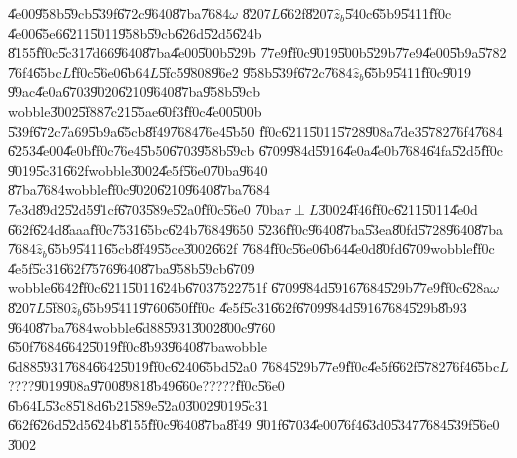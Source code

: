 \U{4e00}\U{958b}\U{59cb}\U{539f}\U{672c}\U{9640}\U{87ba}\U{7684}$\omega $%
\U{8207}$L$\U{662f}\U{8207}$\hat{z}_{b}$\U{540c}\U{65b9}\U{5411}\U{ff0c}%
\U{4e00}\U{65e6}\U{6211}\U{5011}\U{958b}\U{59cb}\U{626d}\U{52d5}\U{624b}%
\U{8155}\U{ff0c}\U{5c31}\U{7d66}\U{9640}\U{87ba}\U{4e00}\U{500b}\U{529b}%
\U{77e9}\U{ff0c}\U{9019}\U{500b}\U{529b}\U{77e9}\U{4e00}\U{5b9a}\U{5782}%
\U{76f4}\U{65bc}$L$\U{ff0c}\U{56e0}\U{6b64}$L$\U{5fc5}\U{9808}\U{96e2}%
\U{958b}\U{539f}\U{672c}\U{7684}$\hat{z}_{b}$\U{65b9}\U{5411}\U{ff0c}\U{9019}%
\U{99ac}\U{4e0a}\U{6703}\U{9020}\U{6210}\U{9640}\U{87ba}\U{958b}\U{59cb}%
wobble\U{3002}\U{5f88}\U{7c21}\U{55ae}\U{60f3}\U{ff0c}\U{4e00}\U{500b}%
\U{539f}\U{672c}\U{7a69}\U{5b9a}\U{65cb}\U{8f49}\U{7684}\U{76e4}\U{5b50}%
\U{ff0c}\U{6211}\U{5011}\U{5728}\U{908a}\U{7de3}\U{5782}\U{76f4}\U{7684}%
\U{6253}\U{4e00}\U{4e0b}\U{ff0c}\U{76e4}\U{5b50}\U{6703}\U{958b}\U{59cb}%
\U{6709}\U{984d}\U{5916}\U{4e0a}\U{4e0b}\U{7684}\U{64fa}\U{52d5}\U{ff0c}%
\U{9019}\U{5c31}\U{662f}wobble\U{3002}\U{4e5f}\U{56e0}\U{70ba}\U{9640}%
\U{87ba}\U{7684}wobble\U{ff0c}\U{9020}\U{6210}\U{9640}\U{87ba}\U{7684}%
\U{7e3d}\U{89d2}\U{52d5}\U{91cf}\U{6703}\U{589e}\U{52a0}\U{ff0c}\U{56e0}%
\U{70ba}$\tau \perp L$\U{3002}\U{4f46}\U{ff0c}\U{6211}\U{5011}\U{4e0d}%
\U{662f}\U{624d}\U{8aaa}\U{ff0c}\U{7531}\U{65bc}\U{624b}\U{7684}\U{9650}%
\U{5236}\U{ff0c}\U{9640}\U{87ba}\U{53ea}\U{80fd}\U{5728}\U{9640}\U{87ba}%
\U{7684}$\hat{z}_{b}$\U{65b9}\U{5411}\U{65cb}\U{8f49}\U{55ce}\U{3002}\U{662f}%
\U{7684}\U{ff0c}\U{56e0}\U{6b64}\U{4e0d}\U{80fd}\U{6709}wobble\U{ff0c}%
\U{4e5f}\U{5c31}\U{662f}\U{7576}\U{9640}\U{87ba}\U{958b}\U{59cb}\U{6709}%
wobble\U{6642}\U{ff0c}\U{6211}\U{5011}\U{624b}\U{6703}\U{7522}\U{751f}%
\U{6709}\U{984d}\U{5916}\U{7684}\U{529b}\U{77e9}\U{ff0c}\U{628a}$\omega $%
\U{8207}$L$\U{5f80}$\hat{z}_{b}$\U{65b9}\U{5411}\U{9760}\U{650f}\U{ff0c}%
\U{4e5f}\U{5c31}\U{662f}\U{6709}\U{984d}\U{5916}\U{7684}\U{529b}\U{8b93}%
\U{9640}\U{87ba}\U{7684}wobble\U{6d88}\U{5931}\U{3002}\U{800c}\U{9760}%
\U{650f}\U{7684}\U{6642}\U{5019}\U{ff0c}\U{8b93}\U{9640}\U{87ba}wobble%
\U{6d88}\U{5931}\U{7684}\U{6642}\U{5019}\U{ff0c}\U{6240}\U{65bd}\U{52a0}%
\U{7684}\U{529b}\U{77e9}\U{ff0c}\U{4e5f}\U{662f}\U{5782}\U{76f4}\U{65bc}$L$%
????\U{9019}\U{908a}\U{9700}\U{8981}\U{8b49}\U{660e}?????\U{ff0c}\U{56e0}%
\U{6b64}L\U{53c8}\U{518d}\U{6b21}\U{589e}\U{52a0}\U{3002}\U{9019}\U{5c31}%
\U{662f}\U{626d}\U{52d5}\U{624b}\U{8155}\U{ff0c}\U{9640}\U{87ba}\U{8f49}%
\U{901f}\U{6703}\U{4e00}\U{76f4}\U{63d0}\U{5347}\U{7684}\U{539f}\U{56e0}%
\U{3002}

\bigskip

